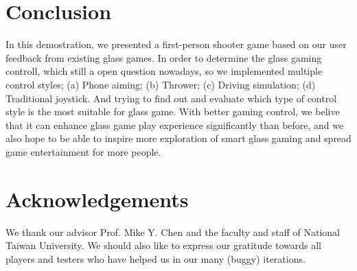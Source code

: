 \documentclass{sigchi}
\begin{document}
\section{Conclusion}
In this demostration, we presented a first-person shooter game based on our user feedback from existing glass games. In order to determine the glass gaming controll, which still a open question nowadays, so we implemented multiple control styles; (a) Phone aiming; (b) Thrower; (c) Driving simulation; (d) Traditional joystick. And trying to find out and evaluate which type of control style is the most suitable for glass game. With better gaming control, we belive that it can enhance glass game play experience significantly than before, and we also hope to be able to inspire more exploration of smart glass gaming and spread game entertainment for more people.


\section{Acknowledgements}
We thank our advisor Prof. Mike Y. Chen and the faculty and staff of National Taiwan University. We should also like to express our gratitude towards all players and testers who have helped us in our many (buggy) iterations.

\balance



\end{document}
